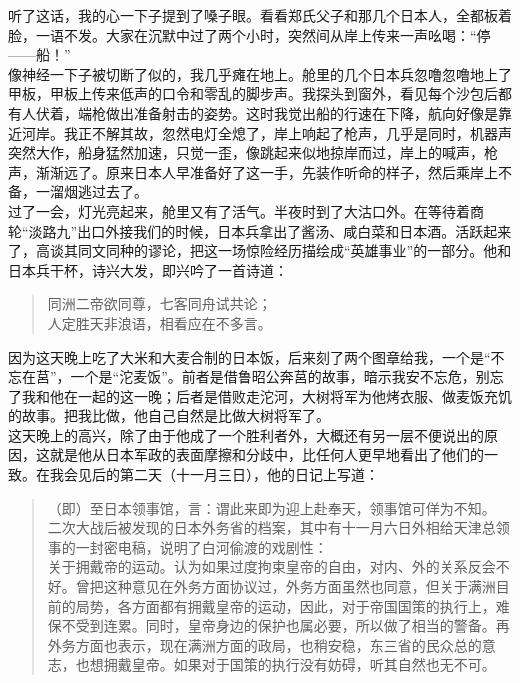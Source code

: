 听了这话，我的心一下子提到了嗓子眼。看看郑氏父子和那几个日本人，全都板着脸，一语不发。大家在沉默中过了两个小时，突然间从岸上传来一声吆喝：“停——船！”\\

像神经一下子被切断了似的，我几乎瘫在地上。舱里的几个日本兵忽噜忽噜地上了甲板，甲板上传来低声的口令和零乱的脚步声。我探头到窗外，看见每个沙包后都有人伏着，端枪做出准备射击的姿势。这时我觉出船的行速在下降，航向好像是靠近河岸。我正不解其故，忽然电灯全熄了，岸上响起了枪声，几乎是同时，机器声突然大作，船身猛然加速，只觉一歪，像跳起来似地掠岸而过，岸上的喊声，枪声，渐渐远了。原来日本人早准备好了这一手，先装作听命的样子，然后乘岸上不备，一溜烟逃过去了。\\

过了一会，灯光亮起来，舱里又有了活气。半夜时到了大沽口外。在等待着商轮“淡路九”出口外接我们的时候，日本兵拿出了酱汤、咸白菜和日本酒。活跃起来了，高谈其同文同种的谬论，把这一场惊险经历描绘成“英雄事业”的一部分。他和日本兵干杯，诗兴大发，即兴吟了一首诗道：\\

\begin{quote}
	同洲二帝欲同尊，七客同舟试共论；\\

人定胜天非浪语，相看应在不多言。\\
\end{quote}

因为这天晚上吃了大米和大麦合制的日本饭，后来刻了两个图章给我，一个是“不忘在莒”，一个是“沱麦饭”。前者是借鲁昭公奔莒的故事，暗示我安不忘危，别忘了我和他在一起的这一晚；后者是借败走沱河，大树将军为他烤衣服、做麦饭充饥的故事。把我比做，他自己自然是比做大树将军了。\\

这天晚上的高兴，除了由于他成了一个胜利者外，大概还有另一层不便说出的原因，这就是他从日本军政的表面摩擦和分歧中，比任何人更早地看出了他们的一致。在我会见后的第二天（十一月三日），他的日记上写道：\\

\begin{quote}
	（即）至日本领事馆，言：谓此来即为迎上赴奉天，领事馆可佯为不知。\\

二次大战后被发现的日本外务省的档案，其中有十一月六日外相给天津总领事的一封密电稿，说明了白河偷渡的戏剧性：\\

关于拥戴帝的运动。认为如果过度拘束皇帝的自由，对内、外的关系反会不好。曾把这种意见在外务方面协议过，外务方面虽然也同意，但关于满洲目前的局势，各方面都有拥戴皇帝的运动，因此，对于帝国国策的执行上，难保不受到连累。同时，皇帝身边的保护也属必要，所以做了相当的警备。再外务方面也表示，现在满洲方面的政局，也稍安稳，东三省的民众总的意志，也想拥戴皇帝。如果对于国策的执行没有妨碍，听其自然也无不可。\\
\end{quote}
